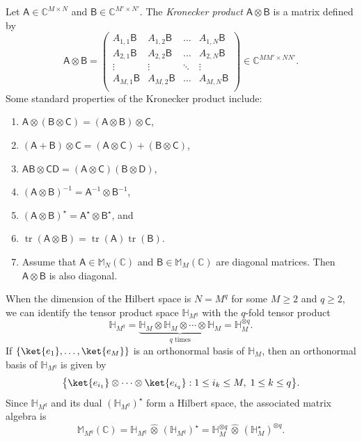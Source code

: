 \documentclass[a4paper,11pt]{article}
\DeclareMathOperator{\tr}{tr}
\newcommand{\rD}{\mathsf{D}}
\newcommand{\rA}{\mathsf{A}}
\newcommand{\rB}{\mathsf{B}}
\newcommand{\rC}{\mathsf{C}}
\begin{document}
Let \(\rA \in \mathbb{C}^{M \times N}\) and \(\rB \in \mathbb{C}^{M' \times N'}\). The \emph{Kronecker product} \(\rA \otimes \rB \) is a matrix defined by
\[
\rA \otimes \rB =
\begin{pmatrix}
A_{1,1}\rB & A_{1,2}\rB & \dots & A_{1,N}\rB \\
A_{2,1}\rB & A_{2,2}\rB & \dots & A_{2,N}\rB \\
\vdots & \vdots & \ddots & \vdots \\
A_{M,1}\rB & A_{M,2}\rB & \dots & A_{M,N}\rB \\
\end{pmatrix} \in \mathbb{C}^{MM' \times NN'}.
\]
Some standard properties of the Kronecker product include:
\begin{enumerate}
  \item \(\rA \otimes (\rB \otimes \rC) = (\rA \otimes \rB) \otimes \rC\),
  \item \((\rA + \rB) \otimes \rC = (\rA \otimes \rC) + (\rB \otimes \rC)\),
  \item \(\rA \rB \otimes \rC \rD = (\rA \otimes \rC)(\rB \otimes \rD)\),
  \item \((\rA \otimes \rB)^{-1} = \rA^{-1} \otimes \rB^{-1}\),
  \item \((\rA \otimes \rB)^{\star} = \rA^{\star} \otimes \rB^{\star}\), and
  \item \(\tr(\rA \otimes \rB) = \tr(\rA) \tr(\rB).\)
  \item Assume that $\rA \in \mathbb{M}_N(\mathbb{C})$ and $\rB \in \mathbb{M}_M(\mathbb{C})$ are diagonal matrices. Then $\rA \otimes \rB$ is also diagonal.
\end{enumerate}
When the dimension of the Hilbert space is \(N = M^q\) for some \(M \ge 2\) and \(q \ge 2\), we can identify the tensor product space \(\mathbb{H}_{M^q}\) with the \(q\)-fold tensor product
\[
\mathbb{H}_{M^q} = \underbrace{\mathbb{H}_{M} \otimes \mathbb{H}_{M} \otimes \cdots \otimes \mathbb{H}_{M}}_{q \text{ times}} = \mathbb{H}_M^{\otimes q}.
\]
If \(\{\ket{e_1},\ldots,\ket{e_M}\}\) is an orthonormal basis of \(\mathbb{H}_M\), then an orthonormal basis of \(\mathbb{H}_{M^q}\) is given by
\[
\bigl\{\ket{e_{i_1}} \otimes \cdots \otimes \ket{e_{i_q}} : 1 \le i_k \le M,\; 1 \le k \le q \bigr\}.
\]
Since \(\mathbb{H}_{M^q}\) and its dual \((\mathbb{H}_{M^q})^{\star}\) form a Hilbert space, the associated matrix algebra is
\[
\mathbb{M}_{M^q}(\mathbb{C}) = \mathbb{H}_{M^q} \,\widehat{\otimes}\, (\mathbb{H}_{M^q})^{\star} = \mathbb{H}_M^{\otimes q} \,\widehat{\otimes}\, (\mathbb{H}_M^{\star})^{\otimes q}.
\]
\end{document}
